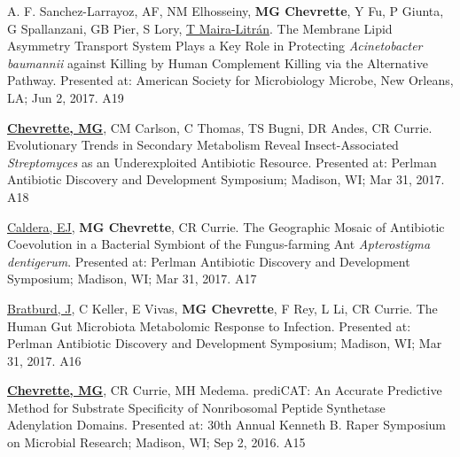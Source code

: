 \newpage



\begin{cvpubs}

  \cvpub
    {A. F. Sanchez-Larrayoz, AF, NM Elhosseiny, \textbf{MG Chevrette}, Y Fu, P Giunta, G Spallanzani, GB Pier, S Lory, \underline{T Maira-Litr\'{a}n}.  The Membrane Lipid Asymmetry Transport System Plays a Key Role in Protecting \textit{Acinetobacter
baumannii} against Killing by Human Complement Killing via the Alternative Pathway.  Presented at: American Society for Microbiology Microbe, New Orleans, LA; Jun 2, 2017.} %
    {A19} %

  \cvpub
    {\underline{\textbf{Chevrette, MG}}, CM Carlson, C Thomas, TS Bugni, DR Andes, CR Currie.  Evolutionary Trends in Secondary Metabolism Reveal Insect-Associated \textit{Streptomyces} as an Underexploited Antibiotic Resource.  Presented at: Perlman Antibiotic Discovery and Development Symposium; Madison, WI; Mar 31, 2017.} %
    {A18} %

  \cvpub
    {\underline{Caldera, EJ}, \textbf{MG Chevrette}, CR Currie.  The Geographic Mosaic of Antibiotic Coevolution in a Bacterial Symbiont of the Fungus-farming Ant \textit{Apterostigma dentigerum}.  Presented at: Perlman Antibiotic Discovery and Development Symposium; Madison, WI; Mar 31, 2017.} %
    {A17} %

  \cvpub
    {\underline{Bratburd, J}, C Keller, E Vivas, \textbf{MG Chevrette}, F Rey, L Li, CR Currie.  The Human Gut Microbiota Metabolomic Response to Infection.  Presented at: Perlman Antibiotic Discovery and Development Symposium; Madison, WI; Mar 31, 2017.} %
    {A16} %

  \cvpub
    {\textbf{\underline{Chevrette, MG}}, CR Currie, MH Medema.  prediCAT: An Accurate Predictive Method for Substrate Specificity of Nonribosomal Peptide Synthetase Adenylation Domains.  Presented at: 30th Annual Kenneth B. Raper Symposium on Microbial Research; Madison, WI; Sep 2, 2016.} %
    {A15} %


\end{cvpubs}
